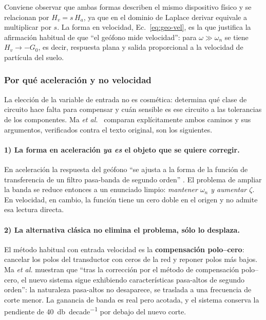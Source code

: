 Conviene observar que ambas formas describen el mismo dispositivo f\'isico y se
relacionan por $H_v=s\,H_a$, ya que en el dominio de Laplace derivar equivale a
multiplicar por $s$. La forma en velocidad, Ec.~\eqref{eq:geo-vel}, es la que
justifica la afirmaci\'on habitual de que ``el ge\'ofono mide velocidad'': para
$\omega\gg\omega_n$ se tiene $H_v\to -G_0$, es decir, respuesta plana y salida
proporcional a la velocidad de part\'icula del suelo.

\subsubsection{Por qu\'e aceleraci\'on y no velocidad}
\label{sec:geo-por-que-aceleracion}

La elecci\'on de la variable de entrada no es cosm\'etica: determina qu\'e clase de
circuito hace falta para compensar y cu\'an sensible es ese circuito a las tolerancias de
los componentes. Ma \emph{et al.}~\cite{Ma2023} comparan expl\'icitamente ambos caminos y
sus argumentos, verificados contra el texto original, son los siguientes.

\paragraph{1) La forma en aceleraci\'on \emph{ya es} el objeto que se quiere corregir.}
En aceleraci\'on la respuesta del ge\'ofono ``se ajusta a la forma de la funci\'on de
transferencia de un filtro pasa-banda de segundo orden'' \cite{Ma2023}. El problema de
ampliar la banda se reduce entonces a un enunciado limpio: \emph{mantener $\omega_n$ y
aumentar $\zeta$}. En velocidad, en cambio, la funci\'on tiene un cero doble en el origen
y no admite esa lectura directa.

\paragraph{2) La alternativa cl\'asica no elimina el problema, s\'olo lo desplaza.}
El m\'etodo habitual con entrada velocidad es la \textbf{compensaci\'on polo--cero}:
cancelar los polos del transductor con ceros de la red y reponer polos m\'as bajos. Ma
\emph{et al.} muestran que ``tras la correcci\'on por el m\'etodo de compensaci\'on
polo--cero, el nuevo sistema sigue exhibiendo caracter\'isticas pasa-altos de segundo
orden'': la naturaleza pasa-altos no desaparece, se traslada a una frecuencia de corte
menor. La ganancia de banda es real pero acotada, y el sistema conserva la pendiente de
\SI{40}{\decibel\per decade} por debajo del nuevo corte.

